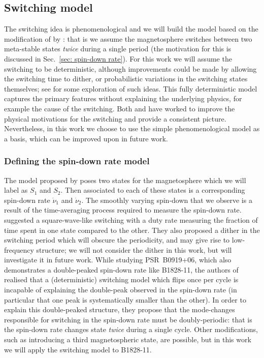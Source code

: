 \documentclass[../full_thesis/full_thesis.tex]{subfiles}
\newcommand{\nudotOne}{\dot{\nu}_{1}}
\newcommand{\nudotTwo}{\dot{\nu}_{2}}
\begin{document}
\subsection{Switching model}
\label{sec: switching}

The switching idea is phenomenological and we will build the model based on the
modification of \citet{Lyne2010} by \citet{Perera2015}: that is we assume the
magnetosphere switches between two meta-stable states \emph{twice} during a
single period (the motivation for this is discussed in Sec.~\ref{sec: spin-down
rate}). For this work we will assume the switching to be deterministic,
although improvements could be made by allowing the switching time to dither,
or probabilistic variations in the switching states themselves; see
\citet{Lyne2010} for some exploration of such ideas. This fully deterministic
model captures the primary features without explaining the underlying physics,
for example the cause of the switching.  Both \citet{Jones2012} and
\citet{Cordes2013} have worked to improve the physical motivations for the
switching and provide a consistent picture. Nevertheless, in this work we
choose to use the simple phenomenological model as a basis, which can be
improved upon in future work.

\subsubsection{Defining the spin-down rate model}
\label{sec: spin-down rate}

The model proposed by \citet{Lyne2010} poses two states for the magnetosphere
which we will label as $S_{1}$ and $S_{2}$. Then associated to each of these
states is a corresponding spin-down rate $\nudotOne$ and $\nudotTwo$. The
smoothly varying spin-down that we observe is a result of the time-averaging
process required to measure the spin-down rate. \citet{Lyne2010} suggested a
square-wave-like switching with a duty rate measuring the fraction of time
spent in one state compared to the other. They also proposed a dither in the
switching period which will obscure the periodicity, and may give rise to
low-frequency structure; we will not consider the dither in this work, but will
investigate it in future work. While studying PSR~B0919+06, which also
demonstrates a double-peaked spin-down rate like B1828-11, the authors of
\citet{Perera2015} realised that a (deterministic) switching model which flips
once per cycle is incapable of explaining the double-peak observed in the
spin-down rate (in particular that one peak is systematically smaller than the
other). In order to explain this double-peaked structure, they propose that the
mode-changes responsible for switching in the spin-down rate must be
doubly-periodic: that is the spin-down rate changes state \emph{twice} during a
single cycle. Other modifications, such as introducing a third magnetospheric
state, are possible, but in this work we will apply the \citet{Perera2015}
switching model to B1828-11.
\end{document}
